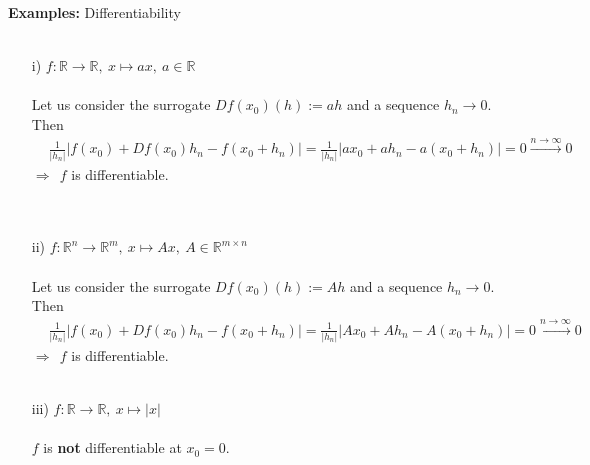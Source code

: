 \begin{frame}
	\textbf{Examples:} Differentiability~\\~\\
	\begin{itemize}
		\item [i)]
		$f:\mathbb{R}\rightarrow\mathbb{R},~x\mapsto ax,~a\in\mathbb{R}$ \\~\\
		{\color{cyan}
			Let us consider the surrogate $Df(x_0)(h):=ah$ and a sequence $h_n\to 0$. Then
			\begin{align*}
			&\frac{1}{|h_n|}|f(x_0)+Df(x_0)h_n-f(x_0+h_n)|=\frac{1}{|h_n|}|ax_0+ah_n-a(x_0+h_n)|=0\xrightarrow{n\to\infty} 0
			\end{align*}
			$\Rightarrow~~f$ is differentiable.\\
		}
	~\\~\\
		\item [ii)]
		$f:\mathbb{R}^n\rightarrow\mathbb{R}^m,~x\mapsto Ax,~A\in\mathbb{R}^{m\times n}$\\~\\
		{\color{cyan}
			Let us consider the surrogate $Df(x_0)(h):=Ah$ and a sequence $h_n\to 0$. Then
			\begin{align*}
			&\frac{1}{|h_n|}|f(x_0)+Df(x_0)h_n-f(x_0+h_n)|=\frac{1}{|h_n|}|Ax_0+Ah_n-A(x_0+h_n)|=0\xrightarrow{n\to\infty} 0
			\end{align*}
			$\Rightarrow~~f$ is differentiable.
		}
	~\\~\\
		\item [iii)]
		$f:\mathbb{R}\rightarrow\mathbb{R},~x\mapsto |x|$\\~\\
		{\color{cyan}
			$f$ is \textbf{not} differentiable at $x_0=0$.
		}
	\end{itemize}
\end{frame}

